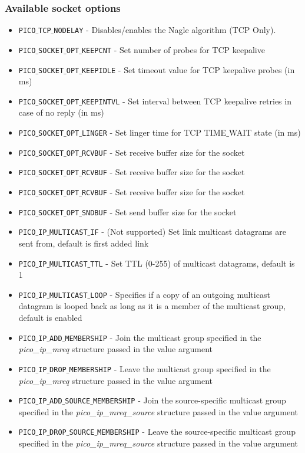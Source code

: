 \subsubsection*{Available socket options}
\begin{itemize}[noitemsep]
\item \texttt{PICO$\_$TCP$\_$NODELAY} - Disables/enables the Nagle algorithm (TCP Only). 
\item \texttt{PICO$\_$SOCKET$\_$OPT$\_$KEEPCNT} - Set number of probes for TCP keepalive
\item \texttt{PICO$\_$SOCKET$\_$OPT$\_$KEEPIDLE} - Set timeout value for TCP keepalive probes (in ms)
\item \texttt{PICO$\_$SOCKET$\_$OPT$\_$KEEPINTVL} - Set interval between TCP keepalive retries in case of no reply (in ms)
\item \texttt{PICO$\_$SOCKET$\_$OPT$\_$LINGER} - Set linger time for TCP TIME$\_$WAIT state (in ms)
\item \texttt{PICO$\_$SOCKET$\_$OPT$\_$RCVBUF} - Set receive buffer size for the socket
\item \texttt{PICO$\_$SOCKET$\_$OPT$\_$RCVBUF} - Set receive buffer size for the socket
\item \texttt{PICO$\_$SOCKET$\_$OPT$\_$RCVBUF} - Set receive buffer size for the socket
\item \texttt{PICO$\_$SOCKET$\_$OPT$\_$SNDBUF} - Set send buffer size for the socket 
\item \texttt{PICO$\_$IP$\_$MULTICAST$\_$IF} - (Not supported) Set link multicast datagrams are sent from, default is first added link
\item \texttt{PICO$\_$IP$\_$MULTICAST$\_$TTL} - Set TTL (0-255) of multicast datagrams, default is 1
\item \texttt{PICO$\_$IP$\_$MULTICAST$\_$LOOP} - Specifies if a copy of an outgoing multicast datagram is looped back as long as it is a member of the multicast group, default is enabled
\item \texttt{PICO$\_$IP$\_$ADD$\_$MEMBERSHIP} - Join the multicast group specified in the \textit{pico\_ip\_mreq} structure passed in the value argument
\item \texttt{PICO$\_$IP$\_$DROP$\_$MEMBERSHIP} - Leave the multicast group specified in the \textit{pico\_ip\_mreq} structure passed in the value argument
\item \texttt{PICO$\_$IP$\_$ADD$\_$SOURCE$\_$MEMBERSHIP} - Join the source-specific multicast group specified in the \textit{pico\_ip\_mreq\_source} structure passed in the value argument
\item \texttt{PICO$\_$IP$\_$DROP$\_$SOURCE$\_$MEMBERSHIP} - Leave the source-specific multicast group specified in the \textit{pico\_ip\_mreq\_source} structure passed in the value argument
\end{itemize}

